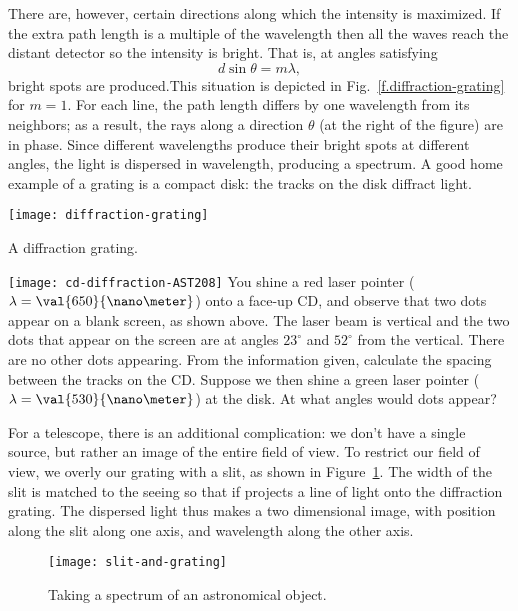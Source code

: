 There are, however, certain directions along which the intensity is maximized. If the extra path length is a multiple of the wavelength then all the waves reach the distant detector so the intensity is bright. That is, at angles satisfying
\begin{equation}
d\sin\theta = m\lambda,
\end{equation}
bright spots are produced.This situation is depicted in Fig.~\ref{f.diffraction-grating} for $m=1$. For each line, the path length differs by one wavelength from its neighbors; as a result, the rays along a direction $\theta$ (at the right of the figure) are in phase.  Since different wavelengths produce their bright spots at different angles, the light is dispersed in wavelength, producing a spectrum.
A good home example of a grating is a compact disk: the tracks on the disk diffract light.

\begin{marginfigure}
\texttt{[image: diffraction-grating]}
\caption{A diffraction grating.
\label{f.diffraction-grating}}
\end{marginfigure}

\begin{exercisebox}
\texttt{[image: cd-diffraction-AST208]}
You shine a red laser pointer ($\lambda=\val{650}{\nano\meter}$) onto a face-up CD, and observe that two dots appear on a blank screen, as shown above. The laser beam is vertical and the two dots that appear on the screen are at angles $23^{\circ}$ and $52^{\circ}$ from the vertical. There are no other dots appearing. From the information given, calculate the spacing between the tracks on the CD.  Suppose we then shine a green laser pointer ($\lambda=\val{530}{\nano\meter}$) at the disk. At what angles would dots appear?
\end{exercisebox}

For a telescope, there is an additional complication: we don't have a single source, but rather an image of the entire field of view. To restrict our field of view, we overly our grating with a slit, as shown in Figure~\ref{f.slit-and-grating}. The width of the slit is matched to the seeing so that if projects a line of light onto the diffraction grating. The dispersed light thus makes a two dimensional image, with position along the slit along one axis, and wavelength along the other axis.

\begin{figure}[htbp]
\texttt{[image: slit-and-grating]}
\caption{Taking a spectrum of an astronomical object.
\label{f.slit-and-grating}}
\end{figure}

